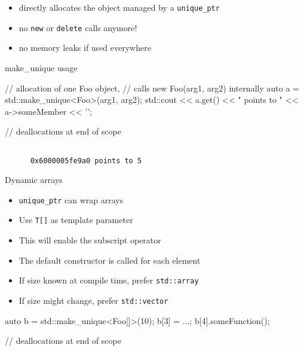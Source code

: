 \begin{frame}[fragile]
  \begin{block}{}
    \begin{itemize}
      \item directly allocates the object managed by a \texttt{unique_ptr}
      \item no \texttt{new} or \texttt{delete} calls anymore!
      \item no memory leaks if used everywhere
    \end{itemize}
  \end{block}
  \pause
  \begin{exampleblock}{make\_unique usage}
    \begin{cppcode*}{}
      // allocation of one Foo object,
      // calls new Foo(arg1, arg2) internally
      auto a = std::make_unique<Foo>(arg1, arg2);
      std::cout << a.get() << " points to "
                << a->someMember << '\n';

      // deallocations at end of scope
    \end{cppcode*}
  \end{exampleblock}
  \begin{block}{}
    \begin{verbatim}

      0x6000005fe9a0 points to 5
    \end{verbatim}
  \end{block}
\end{frame}

\begin{advanced}

\begin{frame}[fragile]
  \begin{block}{Dynamic arrays}
    \begin{itemize}
      \item \texttt{unique_ptr} can wrap arrays
      \item Use \texttt{T[]} as template parameter
      \item This will enable the subscript operator
      \item The default constructor is called for each element
      \item If size known at compile time, prefer \texttt{std::array}
      \item If size might change, prefer \texttt{std::vector}
    \end{itemize}
  \end{block}
  \begin{exampleblock}{}
    \begin{cppcode*}{}
      auto b = std::make_unique<Foo[]>(10);
      b[3] = ...;
      b[4].someFunction();

      // deallocations at end of scope
    \end{cppcode*}
  \end{exampleblock}
\end{frame}

\end{advanced}

